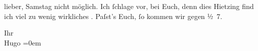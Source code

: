 \pstart
           \noindent{}{\pb}lieber,{ }Samstag nicht möglich. Ich{ }ſchlage \label{K_L01588-1v}\label{K_L01588-1} vor, bei Euch, denn dies Hietzing find ich
               viel zu wenig wirkliches \label{T_L01588-1v}\label{T_L01588-1}.
               Paſst’s Euch,{ }ſo kommen wir gegen ½ 7.\pend
           
\pstart
           Ihr{\\[\baselineskip]}\spacefill\mbox{Hugo}\pend
           \leftskip=0em{}\endnumbering{}  \newcommand{\dateiname}{L01588}\newcommand{\titel}{Hugo von Hofmannsthal an Arthur Schnitzler, [6. oder 7]. 3. 1906}\newcommand{\editorInnen}{Martin Anton Müller und Gerd-Hermann Susen}
